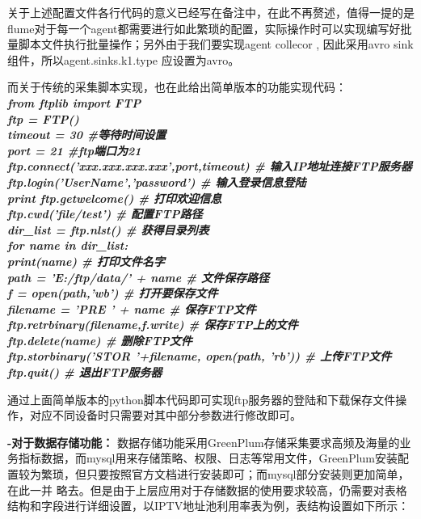 \documentclass{HustGraduPaper}
\begin{document}
    关于上述配置文件各行代码的意义已经写在备注中，在此不再赘述，值得一提的是flume对于每一个agent都需要进行如此繁琐的配置，实际操作时可以实现编写好批量脚本文件执行批量操作；另外由于我们要实现agent collecor ,
    因此采用avro sink组件，所以agent.sinks.k1.type 应设置为avro。

    而关于传统的采集脚本实现，也在此给出简单版本的功能实现代码：\\
    {\songti \bfseries \itshape
    from ftplib import FTP\\
    ftp = FTP()  \\
    timeout = 30  \qquad \#等待时间设置\\ 
    port = 21      \qquad \#ftp端口为21\\
    ftp.connect('xxx.xxx.xxx.xxx',port,timeout) \qquad \# 输入IP地址连接FTP服务器  \\
    ftp.login('UserName','password') \qquad \# 输入登录信息登陆  \\
    print ftp.getwelcome()  \qquad \# 打印欢迎信息   \\
    ftp.cwd('file/test')    \qquad \# 配置FTP路径\\
    dir\_list = ftp.nlst()       \qquad \# 获得目录列表  \\
    for name in dir\_list:  \\
    print(name)             \qquad \# 打印文件名字  \\
    path = 'E:/ftp/data/' + name    \qquad \# 文件保存路径  \\
    f = open(path,'wb')         \qquad \# 打开要保存文件  \\
    filename = 'PRE ' + name   \qquad \# 保存FTP文件  \\
    ftp.retrbinary(filename,f.write) \qquad \# 保存FTP上的文件  \\
    ftp.delete(name)            \qquad \# 删除FTP文件  \\
    ftp.storbinary('STOR '+filename, open(path, 'rb')) \qquad \# 上传FTP文件  \\
    ftp.quit()                  \qquad \# 退出FTP服务器  
    }
    
    通过上面简单版本的python脚本代码即可实现ftp服务器的登陆和下载保存文件操作，对应不同设备时只需要对其中部分参数进行修改即可。
     
    {\songti \bfseries-对于数据存储功能：}
    数据存储功能采用GreenPlum存储采集要求高频及海量的业务指标数据，而mysql用来存储策略、权限、日志等常用文件，GreenPlum安装配置较为繁琐，但只要按照官方文档进行安装即可；而mysql部分安装则更加简单，在此一并
    略去。但是由于上层应用对于存储数据的使用要求较高，仍需要对表格结构和字段进行详细设置，以IPTV地址池利用率表为例，表结构设置如下所示：
\end{document}
